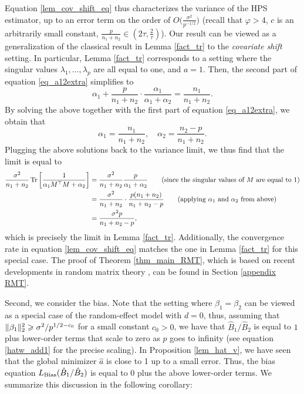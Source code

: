 Equation \eqref{lem_cov_shift_eq} thus characterizes the variance of the HPS estimator, up to an error term on the order of $O\big(\frac{\sigma^2}{p^{-1/2}}\big)$ (recall that $\varphi > 4$, $c$ is an arbitrarily small constant, $\frac{p}{n_1+n_2} \in (2 {\tau}, \frac 2 {\tau})$).
Our result can be viewed as a generalization of the classical result in Lemma \ref{fact_tr} to the \textit{covariate shift} setting.
In particular, Lemma \ref{fact_tr} corresponds to a setting where the singular values $\lambda_1,\dots,\lambda_p$ are all equal to one, and $a = 1$. Then, the second part of equation \eqref{eq_a12extra} simplifies to
\[ \alpha_1 + \frac{p}{n_1 + n_2}\cdot \frac{\alpha_1}{\alpha_1 + \alpha_2} = \frac{n_1}{n_1 + n_2}. \]
By solving the above together with the first part of equation \eqref{eq_a12extra}, we obtain that
$$\alpha_1 = \frac{n_1}{n_1+n_2},\quad \alpha_2 = \frac{n_2-p}{n_1+ n_2}.$$
Plugging the above solutions back to the variance limit, we thus find that the limit is equal to
\begin{align}
    \frac{\sigma^2}{n_1 + n_2} \bigtr{\frac 1 {\alpha_1 M^{\top} M + \alpha_2}} &= \frac{\sigma^2}{n_1 + n_2} \frac{p}{\alpha_1 + \alpha_2} \tag{since the singular values of $M$ are equal to $1$} \nonumber \\
    &= \frac{\sigma^2}{n_1 + n_2} \cdot\frac{p (n_1 + n_2)}{n_1 + n_2 - p} \tag{applying $\alpha_1$ and $\alpha_2$ from above} \nonumber \\
    &= \frac{\sigma^2 p}{n_1 + n_2 - p}, \label{g_id}
\end{align}
which is precisely the limit in Lemma \ref{fact_tr}.
Additionally, the convergence rate in equation \eqref{lem_cov_shift_eq} matches the one in Lemma \ref{fact_tr} for this special case.
The proof of Theorem \ref{thm_main_RMT}, which is based on recent developments in random matrix theory \cite{Anisotropic}, can be found in Section \ref{appendix RMT}.

Second, we consider the bias.
Note that the setting where $\beta_1 = \beta_2$ can be viewed as a special case of the random-effect model with $d = 0$, thus, assuming that $\|\beta_1\|_2^2 \geqslant \sigma^2 / p^{1/2 - c_0}$ for a small constant $c_0 > 0$, we have that $\hat B_1 / \hat B_2$ is equal to $1$ plus lower-order terms that scale to zero as $p$ goes to infinity (see equation \eqref{hatw_add1} for the precise scaling).
In Proposition \ref{lem_hat_v}, we have seen that the global minimizer $\hat a$ is close to 1 up to a small error.
Thus, the bias equation $L_{\textup{Bias}}(\hat B_1 / \hat B_2)$ is equal to $0$ plus the above lower-order terms.
We summarize this discussion in the following corollary:

